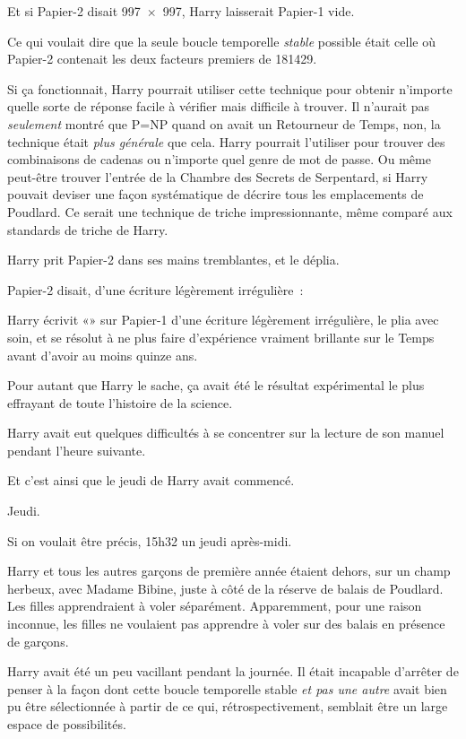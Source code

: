 Et si Papier-2 disait 997~$\times$~997, Harry laisserait Papier-1 vide.

Ce qui voulait dire que la seule boucle temporelle \emph{stable} possible était celle où Papier-2 contenait les deux facteurs premiers de 181429.

Si ça fonctionnait, Harry pourrait utiliser cette technique pour obtenir n'importe quelle sorte de réponse facile à vérifier mais difficile à trouver. Il n'aurait pas \emph{seulement} montré que P=NP quand on avait un Retourneur de Temps, non, la technique était \emph{plus générale} que cela. Harry pourrait l'utiliser pour trouver des combinaisons de cadenas ou n'importe quel genre de mot de passe. Ou même peut-être trouver l'entrée de la Chambre des Secrets de Serpentard, si Harry pouvait deviser une façon systématique de décrire tous les emplacements de Poudlard. Ce serait une technique de triche impressionnante, même comparé aux standards de triche de Harry.

Harry prit Papier-2 dans ses mains tremblantes, et le déplia.

Papier-2 disait, d'une écriture légèrement irrégulière~:


Harry écrivit «» sur Papier-1 d'une écriture légèrement irrégulière, le plia avec soin, et se résolut à ne plus faire d'expérience vraiment brillante sur le Temps avant d'avoir au moins quinze ans.

Pour autant que Harry le sache, ça avait été le résultat expérimental le plus effrayant de toute l'histoire de la science.

Harry avait eut quelques difficultés à se concentrer sur la lecture de son manuel pendant l'heure suivante.

Et c'est ainsi que le jeudi de Harry avait commencé.

\later

Jeudi.

Si on voulait être précis, 15h32 un jeudi après-midi.

Harry et tous les autres garçons de première année étaient dehors, sur un champ herbeux, avec Madame Bibine, juste à côté de la réserve de balais de Poudlard. Les filles apprendraient à voler séparément. Apparemment, pour une raison inconnue, les filles ne voulaient pas apprendre à voler sur des balais en présence de garçons.

Harry avait été un peu vacillant pendant la journée. Il était incapable d'arrêter de penser à la façon dont cette boucle temporelle stable \emph{et pas une autre} avait bien pu être sélectionnée à partir de ce qui, rétrospectivement, semblait être un large espace de possibilités.

